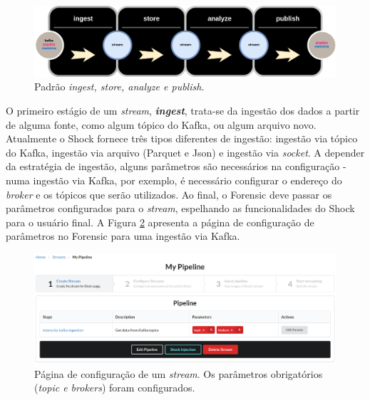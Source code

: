 \begin{figure}
  \centering
  \includegraphics[width=\textwidth]{figuras/arquiteturaforensic.png}
  \caption{Padrão \textit{ingest, store, analyze e publish.}}
  \label{fig:ingeststore}
\end{figure}

O primeiro estágio de um \textit{stream}, \textit{\textbf{ingest}}, trata-se da
ingestão dos dados a partir de alguma fonte, como algum tópico do Kafka, ou
algum arquivo novo. Atualmente o Shock fornece três tipos diferentes de
ingestão: ingestão via tópico do Kafka, ingestão via arquivo (Parquet e Json)
e ingestão via \textit{socket}. A depender da estratégia de ingestão, alguns
parâmetros são necessários na configuração - numa ingestão via Kafka, por
exemplo, é necessário configurar o endereço do
\textit{broker} e os tópicos que serão utilizados. Ao final, o Forensic deve
passar os parâmetros configurados para o \textit{stream}, espelhando as
funcionalidades do Shock para o usuário final. A Figura \ref{fig:forensicparams}
apresenta a página de configuração de parâmetros no Forensic para uma ingestão
via Kafka.



\begin{figure}
  \centering
  \includegraphics[width=\textwidth]{figuras/pipeline.png}
    \caption{Página de configuração de um \textit{stream}. Os parâmetros
obrigatórios (\textit{topic e brokers}) foram configurados.}
  \label{fig:forensicparams}
\end{figure}

